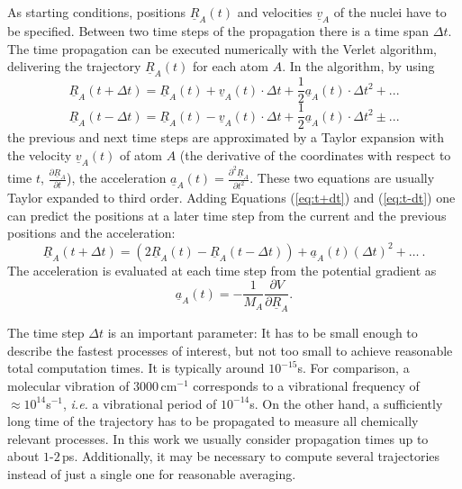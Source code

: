 \documentclass[11pt,DIV=13,BCOR=5mm,a4paper,headinclude]{scrbook}
\renewcommand{\vec}[1]{\underline{#1}}
\begin{document}
As starting conditions, positions $\vec{R}_A(t)$ and velocities $\vec{v}_A$ of the nuclei have to be specified.
Between two time steps of the propagation there is a time span $\Delta t$.
The time propagation can be executed numerically with the Verlet algorithm\cite{verlet}, delivering the trajectory $\vec{R}_A(t)$ for each atom $A$.
In the algorithm, by using
\begin{equation}\label{eq:t+dt}
 \vec{R}_A(t+\Delta t) = \vec{R}_A(t) + \vec{v}_A(t)\cdot \Delta t + \frac{1}{2}\vec{a}_A(t)\cdot \Delta t^2 + ...
 \end{equation}
 \begin{equation}\label{eq:t-dt}
 \vec{R}_A(t-\Delta t) = \vec{R}_A(t) - \vec{v}_A(t)\cdot \Delta t + \frac{1}{2}\vec{a}_A(t)\cdot \Delta t^2 \pm ...
\end{equation}
the previous and next time steps are approximated by a Taylor expansion with the velocity $\vec{v}_A(t)$ of atom $A$ (the derivative of the coordinates with respect to time $t$, $\frac{\partial \vec{R}_A}{\partial t}$), the acceleration $\vec{a}_A(t)=\frac{\partial^2 \vec{R}_A}{\partial t^2}$.
These two equations are usually Taylor expanded to third order.
Adding Equations (\ref{eq:t+dt}) and (\ref{eq:t-dt}) one can predict the positions at a later time step from the current and the previous positions and the acceleration:
\begin{equation}
 \vec{R}_A(t+\Delta t)=(2\vec{R}_A(t) - \vec{R}_A(t-\Delta t)) + \vec{a}_A(t)(\Delta t)^2 + \ldots ~.
\end{equation}
The acceleration is evaluated at each time step from the potential gradient as
\begin{equation}
 \vec{a}_A(t)=-\frac{1}{M_A}\frac{\partial V}{\partial\vec{R}_A}.
\end{equation}


The time step $\Delta t$ is an important parameter: It has to be small enough to describe the fastest processes of interest, but not too small to achieve reasonable total computation times.
It is typically around $10^{-15}$s.
For comparison, a molecular vibration of $3000\,$cm$^{-1}$ corresponds to a vibrational frequency of $\approx 10^{14}$s$^{-1}$, \textit{i.e.} a vibrational period of $10^{-14}$s.
On the other hand, a sufficiently long time of the trajectory has to be propagated to measure all chemically relevant processes.
In this work we usually consider propagation times up to about $1$-$2\,$ps.
Additionally, it may be necessary to compute several trajectories instead of just a single one for reasonable averaging.
\end{document}
